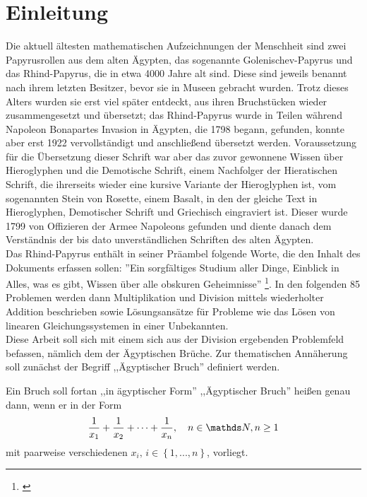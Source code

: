 \section{Einleitung}\label{sec:arithmetic}
Die aktuell ältesten mathematischen Aufzeichnungen der Menschheit sind zwei Papyrusrollen aus dem alten Ägypten, das sogenannte Golenischev-Papyrus und das Rhind-Papyrus, die in etwa 4000 Jahre alt sind. Diese sind jeweils benannt nach ihrem letzten Besitzer, bevor sie in Museen gebracht wurden. Trotz dieses Alters wurden sie erst viel später entdeckt, aus ihren Bruchstücken wieder zusammengesetzt und übersetzt; das Rhind-Papyrus wurde in Teilen während Napoleon Bonapartes Invasion in Ägypten, die 1798 begann, gefunden, konnte aber erst 1922 vervollständigt und anschließend übersetzt werden. Voraussetzung für die Übersetzung dieser Schrift war aber das zuvor gewonnene Wissen über Hieroglyphen und die Demotische Schrift, einem Nachfolger der Hieratischen Schrift, die ihrerseits wieder eine kursive Variante der Hieroglyphen ist, vom sogenannten Stein von Rosette, einem Basalt, in den der gleiche Text in Hieroglyphen, Demotischer Schrift und Griechisch eingraviert ist. Dieser wurde 1799 von Offizieren der Armee Napoleons gefunden und diente danach dem Verständnis der bis dato unverständlichen Schriften des alten Ägypten.\cite[S.33 ff]{Burton2011}\\
Das Rhind-Papyrus enthält in seiner Präambel folgende Worte, die den Inhalt des Dokuments erfassen sollen: ''Ein sorgfältiges Studium aller Dinge, Einblick in Alles, was es gibt, Wissen über alle obskuren Geheimnisse'' \footnote{\cite[S. 37, Übersetzung durch den Autor]{Burton2011}}. In den folgenden 85 Problemen werden dann Multiplikation und Division mittels wiederholter Addition beschrieben sowie Lösungsansätze für Probleme wie das Lösen von linearen Gleichungssystemen in einer Unbekannten.\\
Diese Arbeit soll sich mit einem sich aus der Division ergebenden Problemfeld befassen, nämlich dem der Ägyptischen Brüche. Zur thematischen Annäherung soll zunächst der Begriff  ,,Ägyptischer Bruch'' definiert werden.
\begin{def1}\label{def:egypfrac}
	Ein Bruch soll fortan ,,in ägyptischer Form'' \bzw\xspace,,Ägyptischer Bruch'' heißen genau dann, wenn er in der Form
	$$\uf{x_1} + \uf{x_2} + \cdots + \uf{x_n}, \quad n \in \N, n \ge 1$$
	mit paarweise verschiedenen $x_i, \, i \in \left\{1,...,n\right\}$, vorliegt.
\end{def1}

